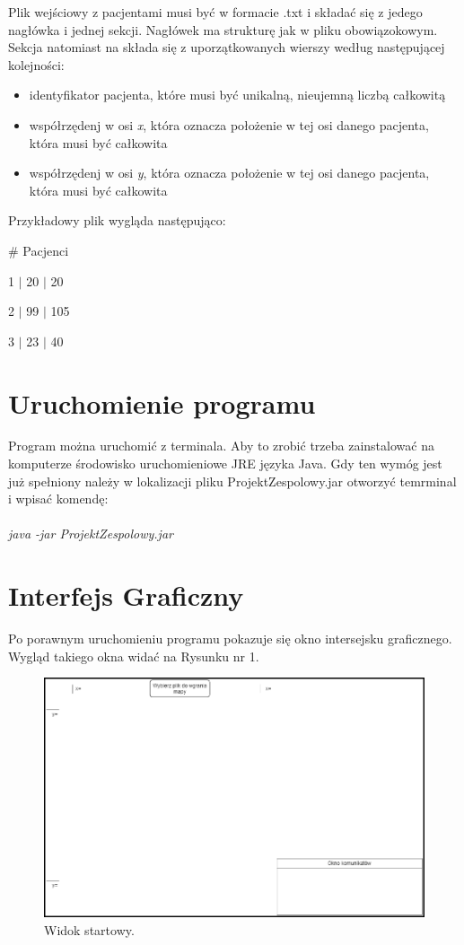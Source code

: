 \documentclass[10pt,a4paper]{article}
\begin{document}
Plik wejściowy z pacjentami musi być w formacie .txt i składać się z jedego nagłówka i jednej sekcji. Nagłówek ma strukturę jak w pliku obowiązokowym. Sekcja natomiast na składa się z uporzątkowanych wierszy według następującej kolejności:
\begin{itemize}
\item identyfikator pacjenta, które musi być unikalną, nieujemną liczbą całkowitą
\item współrzędenj w osi \textit{x}, która oznacza położenie w tej osi danego pacjenta, która musi być całkowita
\item współrzędenj w osi \textit{y}, która oznacza położenie w tej osi danego pacjenta, która musi być całkowita
\end{itemize}
Przykładowy plik wygląda następująco:
\begin{description}[style=multiline,leftmargin=3cm]
\item \# Pacjenci
\item 1 $\mid$ 20 $\mid$ 20
\item 2 $\mid$ 99 $\mid$ 105
\item 3 $\mid$ 23 $\mid$ 40
\end{description}

\section{Uruchomienie programu}

Program można uruchomić z terminala. Aby to zrobić trzeba zainstalować na komputerze środowisko uruchomieniowe JRE języka Java. Gdy ten wymóg jest już spełniony należy w lokalizacji pliku ProjektZespolowy.jar otworzyć temrminal i wpisać komendę: \\
\\
\textsl{java -jar ProjektZespolowy.jar}

\section{Interfejs Graficzny}

Po porawnym uruchomieniu programu pokazuje się okno intersejsku graficznego. Wygląd takiego okna widać na Rysunku nr 1.

\begin{figure}[h]
  \includegraphics[width=\linewidth]{./images/startowy_widok.png}
  \caption{Widok startowy.}
  \label{fig:GUIstart}
\end{figure}
\end{document}
